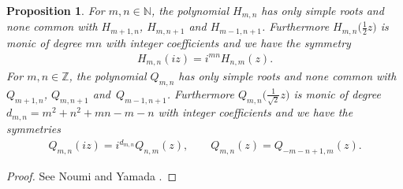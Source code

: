 \documentclass[pdftex]{sigma}
\numberwithin{equation}{section}
\newtheorem{pro}[thm]{Proposition}
\begin{document}
\begin{pro}\label{pro:elementaryprop}
	For $m,n\in\mathbb{N}$, the polynomial $H_{m,n}$ has only simple roots and none common with $H_{m+1,n}$, $H_{m,n+1}$ and $H_{m-1,n+1}$. Furthermore $H_{m,n}\big(\frac{1}{2}z\big)$ is monic of degree $mn$ with integer coefficients and we have the symmetry
	\begin{gather*}%
	H_{m,n}(iz)=i^{mn}H_{n,m}(z).
	\end{gather*}
	For $m,n\in \mathbb{Z}$, the polynomial $Q_{m,n}$ has only simple roots and none common with $Q_{m+1,n}$, $Q_{m,n+1}$ and~$Q_{m-1,n+1}$. Furthermore $Q_{m,n}\big(\frac{1}{\sqrt{2}}z\big)$ is monic of degree $d_{m,n}=m^2+n^2+mn-m-n$ with integer coefficients and we have the symmetries
	\begin{gather*}
	Q_{m,n}(iz)=i^{d_{m,n}}Q_{n,m}(z),\qquad %
	Q_{m,n}(z)=Q_{-m-n+1,m}(z).%
	\end{gather*}
\end{pro}
\begin{proof}
	See Noumi and Yamada \cite{noumiyamada}.
\end{proof}
\end{document}
